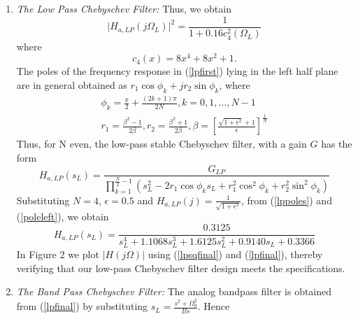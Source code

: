 \documentclass{article}
\begin{document}
\begin{enumerate}

\item {\em The Low Pass Chebyschev Filter:} Thus, we obtain
\begin{equation}
\label{lpsqfinal}
\vert H_{a,LP}(j\Omega_L)\vert^2 = \frac{1}{1 + 0.16c_4^2(\Omega_L)}
\end{equation}
where
\begin{equation}
c_4(x) = 8x^4 + 8x^2 + 1.	
\end{equation}
The poles of the frequency response in (\ref{lpfirst}) lying in the left half plane are in general obtained as 
$r_1\cos\phi_k + jr_2\sin \phi_k$, where
\begin{eqnarray}
\label{lppoles}
\phi_k = \frac{\pi}{2} + \frac{(2k+1)\pi}{2N}, k = 0, 1, \dots, N-1 \nonumber \\
r_1 = \frac{\beta^2 - 1}{2\beta}, r_2 = \frac{\beta^2 + 1}{2\beta}, \beta = \left[ \frac{\sqrt{1 + \epsilon^2} + 1}{\epsilon}\right]^{\frac{1}{N}}
\end{eqnarray}
Thus, for N even, the low-pass stable Chebyschev filter, with a gain $G$ has the form
\begin{equation}
\label{poleleft}
H_{a,LP}(s_L) = \frac{G_{LP}}{\prod_{k = 1}^{\frac{N}{2}-1}(s_L^2 - 2r_1\cos\phi_ks_L + r_1^2\cos^2\phi_k + r_2^2 \sin^2\phi_k)}
\end{equation}
Substituting $N = 4$, $\epsilon = 0.5$ and $H_{a,LP}(j) = \frac{1}{\sqrt{1+\epsilon^2}}$, from (\ref{lppoles}) and (\ref{poleleft}), we obtain 
\begin{equation}
\label{lpfinal}
H_{a,LP}(s_L) = \frac{0.3125}{s_L^4 + 1.1068s_L^3 + 1.6125s_L^2+0.9140s_L + 0.3366}
\end{equation}
In Figure 2 we plot $|H(j\Omega)|$ using (\ref{lpsqfinal}) and (\ref{lpfinal}), thereby verifying that our low-pass Chebyschev filter design meets the specifications.
\item {\em The Band Pass Chebyschev Filter:}  The analog bandpass filter is obtained from (\ref{lpfinal}) by substituting
$s_L = \frac{s^2 + \Omega_0^2}{Bs}$.  Hence

\end{enumerate}
\end{document}

